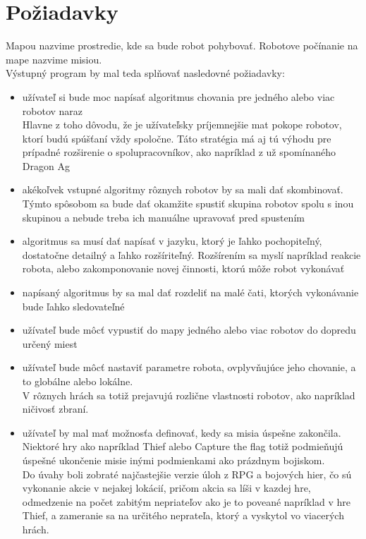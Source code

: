 \section{ Požiadavky }
Mapou nazvime prostredie, kde sa bude robot pohybovať. Robotove počínanie na mape nazvime misiou.\\ Výstupný program by mal teda splňovať nasledovné požiadavky:
\begin {itemize}
\item užívateľ si bude moc napísať algoritmus chovania pre jedného alebo viac robotov naraz \\
	Hlavne z toho dôvodu, že je užívateľsky príjemnejšie mat pokope robotov, ktorí budú spúšťaní vždy spoločne. Táto stratégia má aj tú výhodu pre prípadné rozširenie o spolupracovníkov, ako napríklad z už spomínaného Dragon Ag
\item akékoľvek vstupné algoritmy rôznych robotov by sa mali dať skombinovať.
	\\Týmto spôsobom sa bude dať okamžite spustiť skupina robotov spolu s inou skupinou a nebude treba ich manuálne upravovať pred spustením
\item algoritmus sa musí dať napísať v jazyku, ktorý je ľahko pochopiteľný, dostatočne detailný a ľahko rozšíriteľný.
	Rozšírením sa myslí napríklad reakcie robota, alebo zakomponovanie novej činnosti, ktorú môže robot vykonávať
\item napísaný algoritmus by sa mal dať rozdeliť na malé čati, ktorých vykonávanie bude ľahko sledovateľné
\item užívateľ bude môcť vypustiť do mapy jedného alebo viac robotov do dopredu určený miest
\item užívateľ bude môcť nastaviť parametre robota, ovplyvňujúce jeho chovanie, a to globálne alebo lokálne. \\
	V rôznych hrách sa totiž prejavujú rozlične vlastnosti robotov, ako napríklad ničivosť zbraní.
\item užívateľ by mal mať možnosťa definovať, kedy sa misia úspešne zakončila. \\
	Niektoré hry ako napríklad Thief alebo Capture the flag totiž podmieňujú úspešné ukončenie misie inými podmienkami ako prázdnym bojiskom.\\
	Do úvahy boli zobraté najčastejšie verzie úloh z RPG a bojových hier, čo sú vykonanie akcie v nejakej lokácií, pričom akcia sa líši v kazdej hre, odmedzenie na počet zabitým nepriateľov ako je to poveané napríklad v hre Thief, a zameranie sa na určitého neprateľa, ktorý a vyskytol vo viacerých hrách.

\end{itemize}
